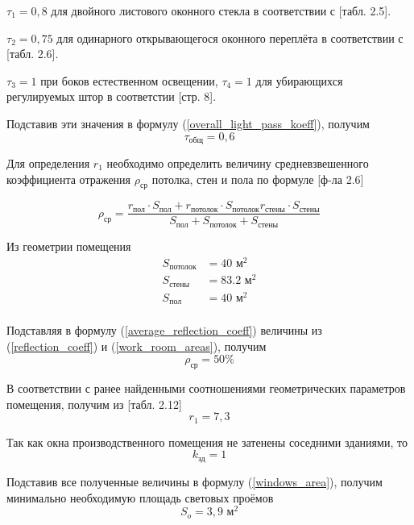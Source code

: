 $\tau_1 = 0,8$ для двойного листового оконного стекла в соответствии с
\cite{lighting_calc_method}[табл. 2.5].

$\tau_2 = 0,75$ для одинарного открывающегося оконного переплёта в соответствии с
\cite{lighting_calc_method}[табл. 2.6].

$\tau_3 = 1$ при боков естественном освещении, $\tau_4 = 1$ для убирающихся
регулируемых штор  в соответстии \cite{lighting_calc_method}[стр. 8].

Подставив эти значения в формулу (\ref{overall_light_pass_koeff}), получим
$$
    \tau_\text{общ} = 0,6
$$

Для определения $r_1$ необходимо определить величину средневзвешенного коэффициента
отражения $\rho_\text{ср}$ потолка, стен и пола по формуле
\cite{lighting_calc_method}[ф-ла 2.6]

\begin{equation}
    \rho_\text{ср} = \frac{ r_\text{пол} \cdot S_\text{пол}
                            + r_\text{потолок} \cdot S_\text{потолок}
                            r_\text{стены} \cdot S_\text{стены}
                            }{
                            S_\text{пол} + S_\text{потолок} + S_\text{стены}
                            }
    \label{average_reflection_coeff}
\end{equation}

Из геометрии помещения
\begin{equation}
    \begin{array}{ll}
        S_\text{потолок}    & = 40 \text{ м}^2      \\
        S_\text{стены}      & = 83.2 \text{ м}^2    \\
        S_\text{пол}        & = 40 \text{ м}^2      \\
    \end{array}
    \label{work_room_areas}
\end{equation}

Подставляя в формулу (\ref{average_reflection_coeff}) величины из (\ref{reflection_coeff})
и (\ref{work_room_areas}), получим
$$
    \rho_\text{ср} = 50 \%
$$

В соответствии с ранее найденными соотношениями геометрических параметров помещения,
получим из \cite{lighting_calc_method}[табл. 2.12]
$$
    r_1 = 7,3
$$

Так как окна производственного помещения не затенены соседними зданиями, то
$$
    k_\text{зд} = 1
$$

Подставив все полученные величины в формулу (\ref{windows_area}), получим
минимально необходимую площадь световых проёмов
$$
    S_o = 3,9 \text{ м}^2
$$


